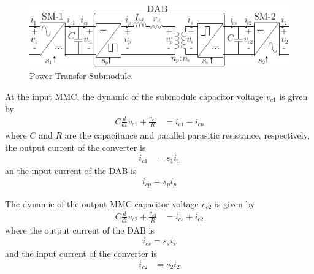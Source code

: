 \documentclass[conference]{IEEEtran}
\begin{document}
\begin{figure}[!t]
\centering
\includegraphics[]{images/DAB.pdf}
\caption{Power Transfer Submodule.}
\label{fig:DAB}
\end{figure}

At the input MMC, the dynamic of the submodule capacitor voltage $v_{c1}$ is given by
\begin{align}\label{eq:inputMMC}
C\frac{d}{dt}v_{c1}+\frac{v_{c1}}{R}&=i_{c1}-i_{cp}
\end{align}
where $C$ and $R$ are the capacitance and parallel parasitic resistance, respectively, the output current of the converter is 
\begin{align}
i_{c1}&=s_{1}i_{1}
\end{align}
an the input current of the DAB is
\begin{align}
i_{cp}=s_{p}i_{p}
\end{align}

The  dynamic of the output MMC capacitor voltage $v_{c2}$ is given by
\begin{align}\label{eq:outputMMC}
C\frac{d}{dt}v_{c2}+\frac{v_{c2}}{R}&=i_{cs}+i_{c2}
\end{align}
where the output current of the DAB is
\begin{align}
i_{cs}=s_{s} i_{s}
\end{align}
and the input current of the converter is
\begin{align}
i_{c2}&=s_{2}i_{2}
\end{align}
\end{document}
